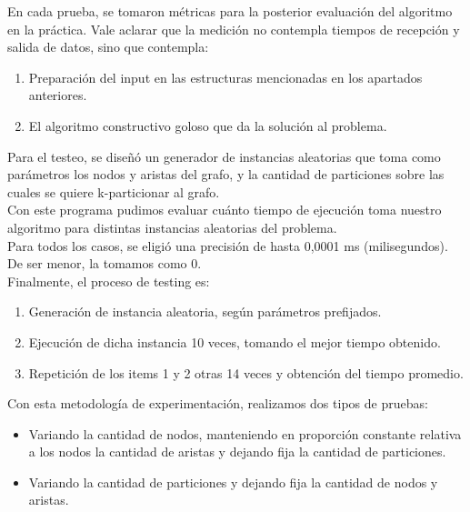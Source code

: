 \noindent En cada prueba, se tomaron métricas para la posterior evaluación del algoritmo en la práctica. Vale aclarar que la medición no contempla tiempos de recepción y salida de datos, sino que contempla:\\

\noindent \begin{enumerate}
\item Preparación del input en las estructuras mencionadas en los apartados anteriores.
\item El algoritmo constructivo goloso que da la solución al problema.\\
\end{enumerate}

\noindent Para el testeo, se diseñó un generador de instancias aleatorias que toma como parámetros los nodos y aristas del grafo, y la cantidad de particiones sobre las cuales se quiere k-particionar al grafo.\\

\noindent Con este programa pudimos evaluar cuánto tiempo de ejecución toma nuestro algoritmo para distintas instancias aleatorias del problema.\\

\noindent Para todos los casos, se eligió una precisión de hasta 0,0001 ms (milisegundos). De ser menor, la tomamos como 0.\\

\noindent Finalmente, el proceso de testing es:\\

\noindent \begin{enumerate}
\item Generación de instancia aleatoria, según parámetros prefijados.
\item Ejecución de dicha instancia 10 veces, tomando el mejor tiempo obtenido.
\item Repetición de los items 1 y 2 otras 14 veces y obtención del tiempo promedio.
\end{enumerate}

\noindent Con esta metodología de experimentación, realizamos dos tipos de pruebas:\\

\noindent \begin{itemize}
\item Variando la cantidad de nodos, manteniendo en proporción constante relativa a los nodos la cantidad de aristas y dejando fija la cantidad de particiones.
\item Variando la cantidad de particiones y dejando fija la cantidad de nodos y aristas.\\
\end{itemize}

